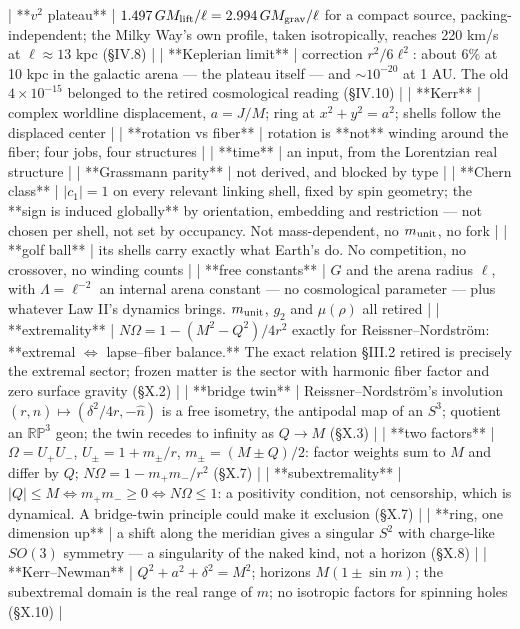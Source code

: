 | **$v^2$ plateau** | $1.497\,GM_{\rm lift}/\ell = 2.994\,GM_{\rm grav}/\ell$ for a compact source, packing-independent; the Milky Way's own profile, taken isotropically, reaches 220 km/s at $\ell\approx13$ kpc (§IV.8) |
| **Keplerian limit** | correction $r^2/6\ell^2$: about $6\%$ at 10 kpc in the galactic arena — the plateau itself — and $\sim10^{-20}$ at 1 AU. The old $4\times10^{-15}$ belonged to the retired cosmological reading (§IV.10) |
| **Kerr** | complex worldline displacement, $a = J/M$; ring at $x^2+y^2 = a^2$; shells follow the displaced center |
| **rotation vs fiber** | rotation is **not** winding around the fiber; four jobs, four structures |
| **time** | an input, from the Lorentzian real structure |
| **Grassmann parity** | not derived, and blocked by type |
| **Chern class** | $\lvert c_1\rvert  = 1$ on every relevant linking shell, fixed by spin geometry; the **sign is induced globally** by orientation, embedding and restriction — not chosen per shell, not set by occupancy. Not mass-dependent, no $m_{\rm unit}$, no fork |
| **golf ball** | its shells carry exactly what Earth's do. No competition, no crossover, no winding counts |
| **free constants** | $G$ and the arena radius $\ell$, with $\Lambda = \ell^{-2}$ an internal arena constant — no cosmological parameter — plus whatever Law II's dynamics brings. $m_{\rm unit}$, $g_2$ and $\mu(\rho)$ all retired |
| **extremality** | $N\Omega = 1-(M^2-Q^2)/4r^2$ exactly for Reissner–Nordström: **extremal $\Leftrightarrow$ lapse–fiber balance.** The exact relation §III.2 retired is precisely the extremal sector; frozen matter is the sector with harmonic fiber factor and zero surface gravity (§X.2) |
| **bridge twin** | Reissner–Nordström's involution $(r,\hat n)\mapsto(\delta^2/4r,-\hat n)$ is a free isometry, the antipodal map of an $S^3$; quotient an $\mathbb{RP}^3$ geon; the twin recedes to infinity as $Q\to M$ (§X.3) |
| **two factors** | $\Omega = U_+U_-$, $U_\pm = 1+m_\pm/r$, $m_\pm = (M\pm Q)/2$: factor weights sum to $M$ and differ by $Q$; $N\Omega = 1-m_+m_-/r^2$ (§X.7) |
| **subextremality** | $\lvert Q\rvert\leq M\Leftrightarrow m_+m_-\geq0\Leftrightarrow N\Omega\leq1$: a positivity condition, not censorship, which is dynamical. A bridge-twin principle could make it exclusion (§X.7) |
| **ring, one dimension up** | a shift along the meridian gives a singular $S^2$ with charge-like $SO(3)$ symmetry — a singularity of the naked kind, not a horizon (§X.8) |
| **Kerr–Newman** | $Q^2+a^2+\delta^2 = M^2$; horizons $M(1\pm\sin m)$; the subextremal domain is the real range of $m$; no isotropic factors for spinning holes (§X.10) |
